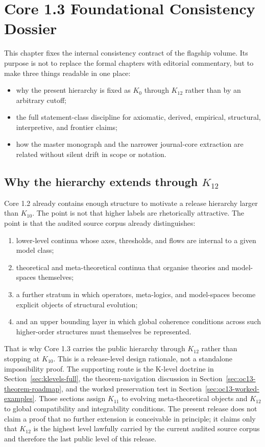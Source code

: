 \section{Core 1.3 Foundational Consistency Dossier}
\label{sec:oc13-foundational-consistency}

This chapter fixes the internal consistency contract of the flagship volume.
Its purpose is not to replace the formal chapters with editorial commentary,
but to make three things readable in one place:

\begin{itemize}
\item why the present hierarchy is fixed as \(K_0\) through \(K_{12}\) rather
      than by an arbitrary cutoff;
\item the full statement-class discipline for axiomatic, derived, empirical,
      structural, interpretive, and frontier claims;
\item how the master monograph and the narrower journal-core extraction are
      related without silent drift in scope or notation.
\end{itemize}

\subsection{Why the hierarchy extends through \texorpdfstring{$K_{12}$}{K12}}

Core 1.2 already contains enough structure to motivate a release hierarchy
larger than \(K_{10}\). The point is not that higher labels are rhetorically
attractive. The point is that the audited source corpus already distinguishes:

\begin{enumerate}
\item lower-level continua whose axes, thresholds, and flows are internal to a
      given model class;
\item theoretical and meta-theoretical continua that organise theories and
      model-spaces themselves;
\item a further stratum in which operators, meta-logics, and model-spaces
      become explicit objects of structural evolution;
\item and an upper bounding layer in which global coherence conditions across
      such higher-order structures must themselves be represented.
\end{enumerate}

That is why Core 1.3 carries the public hierarchy through \(K_{12}\) rather
than stopping at \(K_{10}\). This is a release-level design rationale, not a
standalone impossibility proof. The supporting route is the K-level doctrine in
Section~\ref{sec:klevels-full}, the theorem-navigation discussion in
Section~\ref{sec:oc13-theorem-roadmap}, and the worked preservation test in
Section~\ref{sec:oc13-worked-examples}. Those sections assign \(K_{11}\) to
evolving meta-theoretical objects and \(K_{12}\) to global compatibility and
integrability conditions. The present release does not claim a proof that no
further extension is conceivable in principle; it claims only that \(K_{12}\)
is the highest level lawfully carried by the current audited source corpus and
therefore the last public level of this release.

